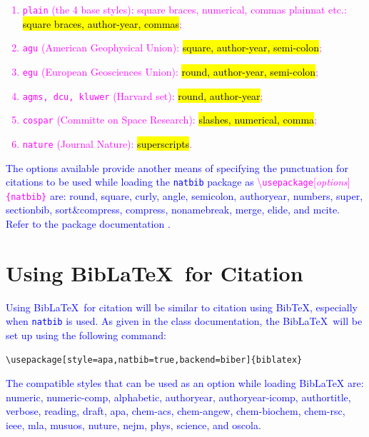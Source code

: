\documentclass[phd,showframe]{ndsu-thesis-2022}
\newcommand\italk[1]{\textcolor{blue}{#1}}  %
\newcommand\cmd[1]{\textbackslash\texttt{#1}}  %
\newcommand\vb[1]{\textcolor{blue}{\texttt{#1}}}%
\begin{document}
\vspace{-6ex}
\textcolor{magenta}{
\begin{enumerate}
\item \texttt{plain} (the 4 base styles): square braces, numerical, commas plainnat etc.: \hl{square braces, author-year, commas};
\item \texttt{agu} (American Geophysical Union): \hl{square, author-year, semi-colon};
\item \texttt{egu} (European Geosciences Union): \hl{round, author-year, semi-colon};
\item \texttt{agms, dcu, kluwer} (Harvard set): \hl{round, author-year};
\item \texttt{cospar} (Committe on Space Research): \hl{slashes, numerical, comma};
\item \texttt{nature} (Journal Nature): \hl{superscripts}.
\end{enumerate}
}

\italk{
The options available provide another means of specifying the punctuation
for citations to be used while loading the \texttt{natbib} package as \textcolor{magenta}{\cmd{usepackage}[\emph{options}]\texttt{\{natbib\}}} are: \textbullet\:round, \textbullet\:square, \textbullet\:curly, \textbullet\:angle, \textbullet\:semicolon, \textbullet\:authoryear, \textbullet\:numbers, \textbullet\:super, \textbullet\:sectionbib, \textbullet\:sort\&compress, \textbullet\:compress, \textbullet\:nonamebreak, \textbullet\:merge, \textbullet\:elide, and \textbullet\:mcite. Refer to the package documentation \citep{daly2010natural}.  
}

\section{Using Bib\LaTeX\ for Citation}
\italk{Using Bib\LaTeX\ for citation will be similar to citation using BibTeX, especially when \vb{natbib} is used. As given in the class documentation, the Bib\LaTeX\ will be set up using the following command:
}

\vh
{
\begin{verbatim}
\usepackage[style=apa,natbib=true,backend=biber]{biblatex}
\end{verbatim}
}

\vo
\italk{The compatible styles that can be used as an option while loading Bib\LaTeX\/ are: \textbullet\:numeric, \textbullet\:numeric-comp, \textbullet\:alphabetic, \textbullet\:authoryear, \textbullet\:authoryear-icomp, \textbullet\:authortitle, \textbullet\:verbose, \textbullet\:reading, \textbullet\:draft, \textbullet\:apa, \textbullet\:chem-acs, \textbullet\:chem-angew, \textbullet\:chem-biochem, \textbullet\:chem-rsc, \textbullet\:ieee, \textbullet\:mla, \textbullet\:musuos, \textbullet\:nuture, \textbullet\:nejm, \textbullet\:phys, \textbullet\:science, and \textbullet\:oscola.}
\end{document}

